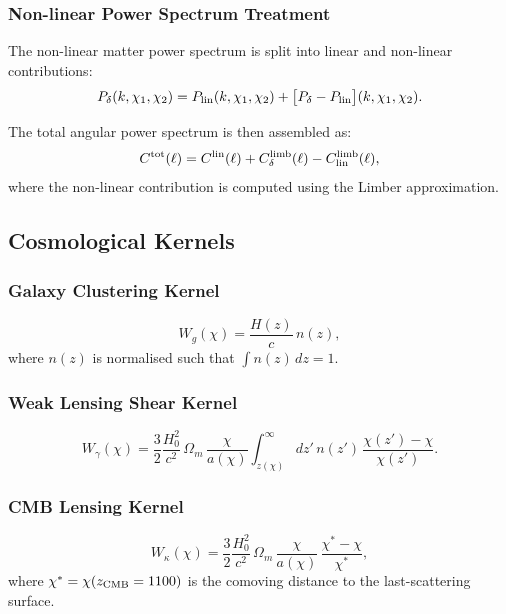 \subsubsection{Non-linear Power Spectrum Treatment}

The non-linear matter power spectrum is split into linear and non-linear
contributions:
\begin{equation}
    P_\delta(k,\chi_1,\chi_2) = P_{\rm lin}(k,\chi_1,\chi_2)
    + \bigl[P_\delta - P_{\rm lin}\bigr](k,\chi_1,\chi_2).
    \label{eq:Pk_split}
\end{equation}

The total angular power spectrum is then assembled as:
\begin{equation}
    C^{\rm tot}(\ell) = C^{\rm lin}(\ell)
    + C^{\rm limb}_\delta(\ell) - C^{\rm limb}_{\rm lin}(\ell),
    \label{eq:Cl_total}
\end{equation}
where the non-linear contribution is computed using the Limber approximation.

\subsection{Cosmological Kernels}

\subsubsection{Galaxy Clustering Kernel}
\begin{equation}
    W_g(\chi) = \frac{H(z)}{c}\,n(z),
\end{equation}
where $n(z)$ is normalised such that $\int n(z)\,dz = 1$.

\subsubsection{Weak Lensing Shear Kernel}
\begin{equation}
    W_\gamma(\chi) = \frac{3}{2}\frac{H_0^2}{c^2}\,\Omega_m\,
    \frac{\chi}{a(\chi)}
    \int_{z(\chi)}^\infty dz'\,n(z')\,\frac{\chi(z')-\chi}{\chi(z')}.
\end{equation}

\subsubsection{CMB Lensing Kernel}
\begin{equation}
    W_\kappa(\chi) = \frac{3}{2}\frac{H_0^2}{c^2}\,\Omega_m\,
    \frac{\chi}{a(\chi)}\,\frac{\chi^* - \chi}{\chi^*},
\end{equation}
where $\chi^* = \chi(z_{\rm CMB} = 1100)$ is the comoving distance to the
last-scattering surface.


